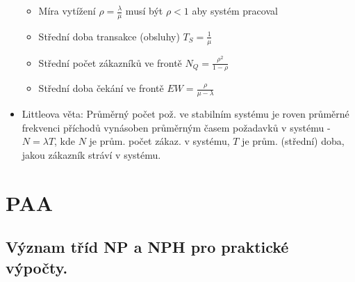\documentclass[a4paper,hidelinks]{article}
\begin{document}
\begin{itemize}
    \begin{itemize}
        \item Míra vytížení $\rho=\frac{\lambda}{\mu}$ musí být $\rho<1$ aby systém pracoval
        \item Střední doba transakce (obsluhy) $T_S=\frac{1}{\mu}$
        \item Střední počet zákazníků ve frontě $N_Q=\frac{\rho^2}{1-\rho}$
        \item Střední doba čekání ve frontě $EW=\frac{\rho}{\mu-\lambda}$
    \end{itemize}
    \item Littleova věta: Průměrný počet pož. ve stabilním systému je roven průměrné frekvenci příchodů vynásoben průměrným časem požadavků v systému - $N=\lambda T$, kde $N$ je prům. počet zákaz. v systému, $T$ je prům. (střední) doba, jakou zákazník stráví v systému.
\end{itemize}


\section{PAA}


\subsection{Význam tříd NP a NPH pro praktické výpočty.}
\end{document}
